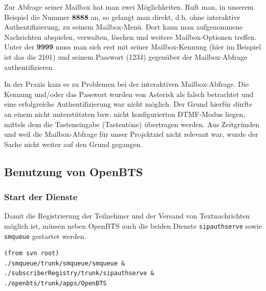 \begin{itemize}
\begin{enumerate}
Zur Abfrage seiner Mailbox hat man zwei Möglichkeiten. Ruft man, in unserem Beispiel die Nummer \textbf{8888} an, so gelangt man direkt, d.h. ohne interaktive Authentifizierung, zu seinem Mailbox-Menü. Dort kann man aufgenommene Nachrichten abspielen, verwalten, löschen und weitere Mailbox-Optionen treffen. Unter der \textbf{9999} muss man sich erst mit seiner Mailbox-Kennung (hier im Beispiel ist das die 2101) und seinem Passwort (1234) gegenüber der Mailbox-Abfrage authentifizieren.

In der Praxis kam es zu Problemen bei der interaktiven Mailbox-Abfrage. Die Kennung und/oder das Passwort wurden von Asterisk als falsch betrachtet und eine erfolgreiche Authentifizierung war nicht möglich. Der Grund hierfür dürfte an einem nicht unterstützten bzw. nicht konfigurierten DTMF-Modus liegen, mittels dem die Tasteneingabe (Tastentöne) übertragen werden. Aus Zeitgründen und weil die Mailbox-Abfrage für unser Projektziel nicht relevant war, wurde der Sache nicht weiter auf den Grund gegangen.
\end{enumerate}
\end{itemize} 

\subsection{Benutzung von OpenBTS}
\subsubsection{Start der Dienste}
Damit die Registrierung der Teilnehmer und der Versand von Textnachrichten möglich ist, müssen neben OpenBTS auch die beiden Dienste \verb|sipauthserve| sowie \verb|smqueue| gestartet werden.
\begin{verbatim}
(from svn root)
./smqueue/trunk/smqueue/smqueue &
./subscriberRegistry/trunk/sipauthserve &
./openbts/trunk/apps/OpenBTS
\end{verbatim}
\newpage

